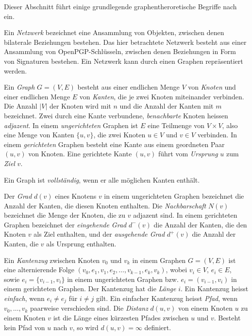 Dieser Abschnitt f\"uhrt einige grundlegende graphentheroretische
Begriffe nach \cite{Brandes2004} ein.
  
Ein \emph{Netzwerk} bezeichnet eine Ansammlung von Objekten, zwischen
denen bilaterale Beziehungen bestehen. Das hier betrachtete Netzwerk
besteht aus einer Ansammlung von OpenPGP-Schl\"usseln, zwischen denen
Beziehungen in Form von Signaturen bestehen. Ein Netzwerk kann durch einen
Graphen repr\"asentiert werden.

Ein \emph{Graph} $G=(V, E)$ besteht aus einer endlichen Menge $V$ von
\emph{Knoten} und einer endlichen Menge $E$ von \emph{Kanten}, die je
zwei Knoten miteinander verbinden. Die Anzahl $|V|$ der Knoten wird mit
$n$ und die Anzahl der Kanten mit $m$ bezeichnet. Zwei durch eine
Kante verbundene, \emph{benachbarte} Knoten heissen
\emph{adjazent}. In einem \emph{ungerichteten} Graphen ist $E$ eine
Teilmenge von $V\times V$, also eine Menge von Kanten $\{u, v\}$, die
zwei Knoten $u \in V$ und $v\in V$ verbinden. In einem
\emph{gerichteten} Graphen besteht eine Kante aus einem geordneten
Paar $(u, v)$ von Knoten. Eine gerichtete Kante $(u, v)$ f\"uhrt vom
\emph{Ursprung} $u$ zum \emph{Ziel} $v$.

Ein Graph ist \emph{vollst\"andig}, wenn er alle m\"oglichen Kanten
enth\"alt.

Der \emph{Grad} $d(v)$ eines Knotens $v$ in einem ungerichteten
Graphen bezeichnet die Anzahl der Kanten, die diesen Knoten
enthalten. Die \emph{Nachbarschaft} $N(v)$ bezeichnet die Menge der
Knoten, die zu $v$ adjazent sind. In einem gerichteten Graphen
bezeichnet der \emph{eingehende Grad} $d^{-}(v)$ die Anzahl der
Kanten, die den Knoten $v$ als Ziel enthalten, und der
\emph{ausgehende Grad} $d^{+}(v)$ die Anzahl der Kanten, die $v$ als
Ursprung enthalten.

Ein \emph{Kantenzug} zwischen Knoten $v_0$ und $v_k$ in einem Graphen
$G=(V, E)$ ist eine alternierende Folge $(v_0, e_1, v_1, e_2, \dots,
v_{k-1}, e_k, v_k)$, wobei $v_i \in V$, $e_i \in E$, sowie $e_i =
\{v_{i-1}, v_{i}\}$ in einem ungerichteten Graphen bzw. $e_i =
(v_{i-1}, v_{i})$ in einem gerichteten Graphen. Der Kantenzug hat die
\emph{L\"ange} $i$. Ein Kantenzug heisst \emph{einfach}, wenn $e_i \ne
e_j$ f\"ur $i \ne j$ gilt.  Ein einfacher Kantenzug heisst
\emph{Pfad}, wenn $v_0, \dots, v_k$ paarweise verschieden sind. Die
\emph{Distanz} $d(u, v)$ von einem Knoten $u$ zu einem Knoten $v$ ist die
L\"ange eines k\"urzesten Pfades zwischen $u$ und $v$. Besteht kein
Pfad von $u$ nach $v$, so wird $d(u,v) = \infty$ definiert.


